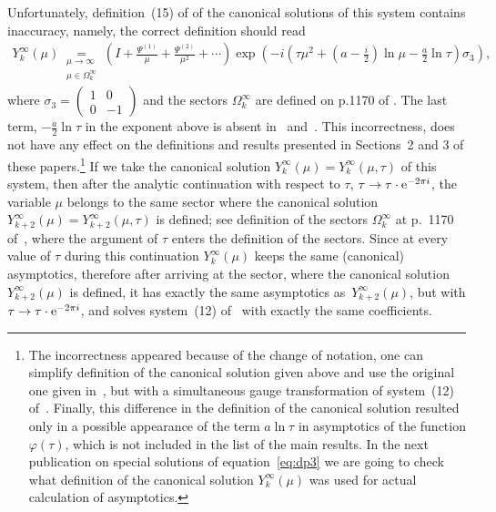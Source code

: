 \documentclass[pdftex]{sigma}
\numberwithin{equation}{section}
\begin{document}
Unfortunately, definition~(15) of \cite{KV2004} of the canonical solutions of this system contains inaccuracy,
namely, the correct definition should read
\begin{gather*}%
Y_k^\infty(\mu)\underset{\substack{\mu\to\infty\\\mu\in\Omega_k^\infty}}=\left( I+\frac{\Psi^{(1)}}{\mu}+
\frac{\Psi^{(2)}}{\mu^2}+\cdots \right)
\exp\left( -i\left(\tau\mu^2+\left(a-\frac{i}{2}\right)\ln\mu-\frac{a}{2}\ln\tau\right)\sigma_3 \right),
\end{gather*}
where $\sigma_3=\left(\begin{smallmatrix}1&0\\0&-1\end{smallmatrix}\right)$ and the sectors $\Omega_k^\infty$ are defined on p.1170
of \cite{KV2004}.
The last term, $-\frac{a}{2}\ln\tau$ in the exponent above is absent in~\cite{KV2004} and~\cite{KV2010}. This
incorrectness, does not have any effect on the definitions and results presented in Sections~2 and 3 of these
papers.\footnote{The incorrectness appeared because of the change of notation, one can simplify definition of
the canonical solution given above and use the original one given in~\cite{KV2004}, but with a simultaneous
gauge transformation of system~(12) of~\cite{KV2004}. Finally, this difference in the definition of the canonical
solution resulted only in a possible appearance of the term $a\ln\tau$ in asymptotics of the function
$\varphi(\tau)$, which is not included in the list of the main results. In the next publication on special solutions
of equation~\eqref{eq:dp3} we are going to check what definition of the canonical solution $Y_k^\infty(\mu)$ was
used for actual calculation of asymptotics.}
If we take the canonical solution $Y_k^\infty(\mu)=Y_k^\infty(\mu,\tau)$ of this
system, then after the analytic continuation with respect to $\tau$, $\tau\to\tau\cdot {\rm e}^{-2\pi i}$,
the variable $\mu$ belongs to the same sector where the canonical solution
$Y_{k+2}^\infty(\mu)=Y_{k+2}^\infty(\mu,\tau)$ is defined;
see definition of the sectors $\Omega_k^\infty$ at p.~1170 of~\cite{KV2004}, where the argument of $\tau$ enters
the definition of the sectors. Since at every value of $\tau$ during this continuation $Y_k^\infty(\mu)$ keeps the
same (canonical) asymptotics, therefore after arriving at the sector, where the canonical solution
$Y_{k+2}^\infty(\mu)$ is defined, it has exactly the same asymptotics as~$Y_{k+2}^\infty(\mu)$,
but with $\tau\to\tau\cdot {\rm e}^{-2\pi i}$, and solves system~(12) of~\cite{KV2004} with exactly the same coefficients.
\end{document}
